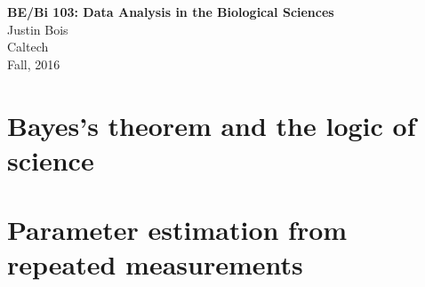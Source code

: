 \documentclass [12pt,letter]{article}
\theoremstyle{plain}
\theoremstyle{plain}
\theoremstyle{definition}
\theoremstyle{definition}
\numberwithin{equation}{section}
\begin{document}
% 

\vspace{10cm}
\begin{center}
\Huge{\textbf{BE/Bi 103: Data Analysis in the Biological Sciences}} \\ \vspace{2mm}
\Large{Justin Bois} \\ \vspace{2mm}
\Large{Caltech} \\ \vspace{2mm}
\Large{Fall, 2016} \\

\vspace{15em}

\footnotesize{}
\end{center}

\thispagestyle{empty}

\pagebreak
\setcounter{page}{1}

\section{Bayes's theorem and the logic of science}
\label{sec:bayes_logic}


\pagebreak

\section{Parameter estimation from repeated measurements}
\label{sec:parameter_estimation}


\pagebreak

\end{document}
